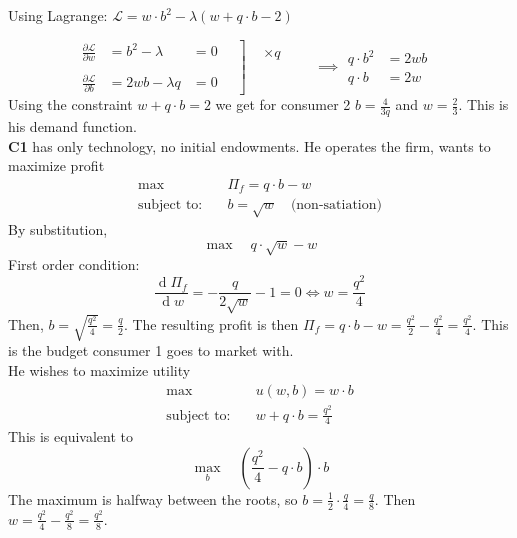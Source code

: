 \documentclass{article}
\renewcommand{\d}[1]{\ensuremath{\operatorname{d}\!{#1}}}
\renewcommand{\d}[1]{\ensuremath{\operatorname{d}\!{#1}}}
\begin{document}
\noindent
Using Lagrange: $\mathcal{L}=w\cdot b^2-\lambda(w+q\cdot b-2)$

\begin{equation*}
    \left.
    \begin{aligned}
        \frac{\partial \mathcal{L}}{\partial w}&=b^2-\lambda&=0\\ \\
        \frac{\partial \mathcal{L}}{\partial b}&=2wb-\lambda q&=0
    \end{aligned}
    \quad
    \right]
    \begin{aligned}
        &\times q\\
        &\\
        &\\
        &\\
    \end{aligned}
    \quad\quad\implies
    \begin{aligned}
    &\\
    q\cdot b^2&=2wb\\
    q\cdot b &= 2w
    &\\
    \end{aligned}
\end{equation*}
Using the constraint $w+q\cdot b=2$ we get for consumer 2 $b=\frac{4}{3q}$ and $w=\frac{2}{3}$. This is his demand function.\\

\noindent
\textbf{C1} has only technology, no initial endowments. He operates the firm, wants to maximize profit
\begin{equation*}
    \begin{aligned}
    \max\quad&\Pi_f=q\cdot b-w\\
    \text{subject to:}\quad&b=\sqrt{w}\quad\text{(non-satiation)}
    \end{aligned}
\end{equation*}
By substitution,
\begin{equation*}
    \max\quad q\cdot\sqrt{w}-w
\end{equation*}
First order condition:
\begin{equation*}
    \frac{\d \Pi_f}{\d w}=-\frac{q}{2\sqrt{w}}-1=0\iff w=\frac{q^2}{4}
\end{equation*}
Then, $b=\sqrt{\frac{q^2}{4}}=\frac{q}{2}$. The resulting profit is then $\Pi_f=q\cdot b - w = \frac{q^2}{2}-\frac{q^2}{4}=\frac{q^2}{4}$. This is the budget consumer 1 goes to market with.\\

\noindent
He wishes to maximize utility
\begin{equation*}
    \begin{aligned}
        \max\quad&u(w,b)=w\cdot b\\
        \text{subject to:}\quad&w+q\cdot b = \frac{q^2}{4}
    \end{aligned}
\end{equation*}
This is equivalent to
\begin{equation*}
    \max_b\quad\left(\frac{q^2}{4}-q\cdot b\right)\cdot b
\end{equation*}
The maximum is halfway between the roots, so $b=\frac{1}{2}\cdot\frac{q}{4}=\frac{q}{8}$. Then $w=\frac{q^2}{4}-\frac{q^2}{8}=\frac{q^2}{8}$.
\end{document}

